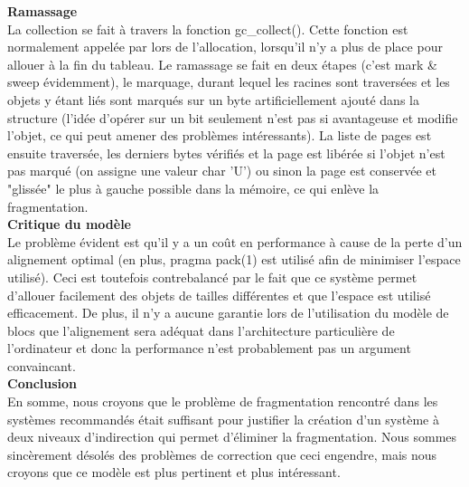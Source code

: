 \documentclass[a4paper, 12pt] {article}
\begin{document}
\noindent
{\bf Ramassage}\\
\noindent
La collection se fait à travers la fonction gc\_collect(). Cette fonction est normalement appelée par lors de l'allocation, lorsqu'il n'y 
a plus de place pour allouer à la fin du tableau. Le ramassage se fait en deux étapes (c'est mark \& sweep évidemment), le marquage, durant
lequel les racines sont traversées et les objets y étant liés sont marqués sur un byte artificiellement ajouté dans la structure (l'idée
d'opérer sur un bit seulement n'est pas si avantageuse et modifie l'objet, ce qui peut amener des problèmes intéressants). La liste
de pages est ensuite traversée, les derniers bytes vérifiés et la page est libérée si l'objet n'est pas marqué (on assigne une valeur 
char 'U') ou sinon la page est conservée et "glissée" le plus à gauche possible dans la mémoire, ce qui enlève la fragmentation.\\

\noindent
{\bf Critique du modèle}\\
\noindent
Le problème évident est qu'il y a un coût en performance à cause de la perte d'un alignement optimal (en plus, pragma pack(1) est 
utilisé afin de minimiser l'espace utilisé). Ceci est toutefois contrebalancé par le fait que ce système permet d'allouer facilement
des objets de tailles différentes et que l'espace est utilisé efficacement. De plus, il n'y a aucune garantie lors de l'utilisation du
modèle de blocs que l'alignement sera adéquat dans l'architecture particulière de l'ordinateur et donc la performance n'est probablement
pas un argument convaincant.\\

\noindent
{\bf Conclusion}\\
\noindent
En somme, nous croyons que le problème de fragmentation rencontré dans les systèmes recommandés était suffisant pour justifier
la création d'un système à deux niveaux d'indirection qui permet d'éliminer la fragmentation. Nous sommes sincèrement désolés des problèmes
de correction que ceci engendre, mais nous croyons que ce modèle est plus pertinent et plus intéressant. 
\end{document}
